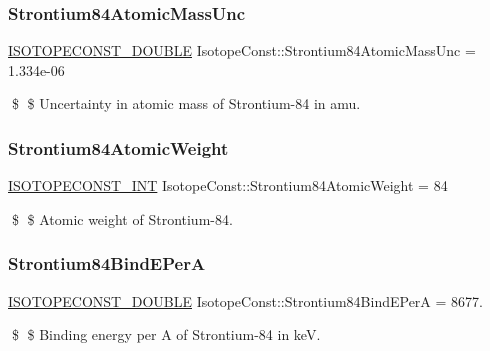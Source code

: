 \subsubsection{\texorpdfstring{Strontium84\+Atomic\+Mass\+Unc}{Strontium84AtomicMassUnc}}
{\footnotesize\ttfamily \mbox{\hyperlink{group___isotope_const-_macros_ga8f45a7272ce02c0b4c65c44636ed719a}{I\+S\+O\+T\+O\+P\+E\+C\+O\+N\+S\+T\+\_\+\+D\+O\+U\+B\+LE}} Isotope\+Const\+::\+Strontium84\+Atomic\+Mass\+Unc = 1.\+334e-\/06}

\$ \$ Uncertainty in atomic mass of Strontium-\/84 in amu. \mbox{\label{group___isotope_const-_strontium-_sr84_ga21d207af6e43f014e08141eede004f0c}} 
\subsubsection{\texorpdfstring{Strontium84\+Atomic\+Weight}{Strontium84AtomicWeight}}
{\footnotesize\ttfamily \mbox{\hyperlink{group___isotope_const-_macros_ga5f18360b3e99483a35c32d789e62621c}{I\+S\+O\+T\+O\+P\+E\+C\+O\+N\+S\+T\+\_\+\+I\+NT}} Isotope\+Const\+::\+Strontium84\+Atomic\+Weight = 84}

\$ \$ Atomic weight of Strontium-\/84. \mbox{\label{group___isotope_const-_strontium-_sr84_gadfbbb3d8a6a4c2668406c878203c1243}} 
\subsubsection{\texorpdfstring{Strontium84\+Bind\+E\+PerA}{Strontium84BindEPerA}}
{\footnotesize\ttfamily \mbox{\hyperlink{group___isotope_const-_macros_ga8f45a7272ce02c0b4c65c44636ed719a}{I\+S\+O\+T\+O\+P\+E\+C\+O\+N\+S\+T\+\_\+\+D\+O\+U\+B\+LE}} Isotope\+Const\+::\+Strontium84\+Bind\+E\+PerA = 8677.}

\$ \$ Binding energy per A of Strontium-\/84 in keV. \mbox{\label{group___isotope_const-_strontium-_sr84_ga3ac07022c4552241ca6c00d8a763c9c8}} 
